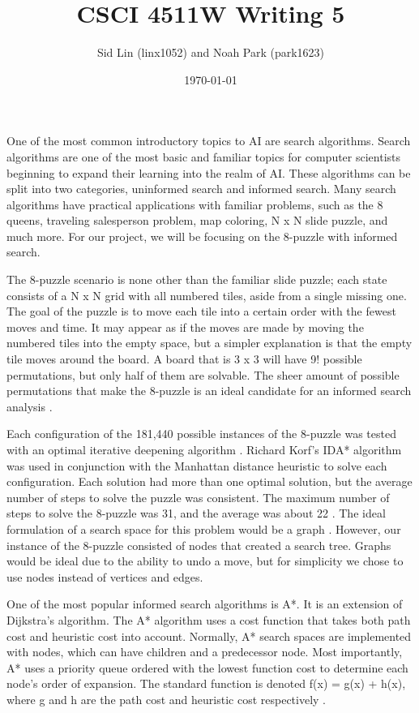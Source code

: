 \documentclass{article}
\title{CSCI 4511W Writing 5}
\date{\today}
\author{Sid Lin (linx1052) and Noah Park (park1623)}
\begin{document}
\maketitle

One of the most common introductory topics to AI are search algorithms. Search algorithms are one of the most basic and familiar topics for computer scientists beginning to expand their learning into the realm of AI. These algorithms can be split into two categories, uninformed search and informed search. Many search algorithms have practical applications with familiar problems, such as the 8 queens, traveling salesperson problem, map coloring, N x N slide puzzle, and much more. For our project, we will be focusing on the 8-puzzle with informed search.
\newline
\newline

The 8-puzzle scenario is none other than the familiar slide puzzle; each state consists of a N x N grid with all numbered tiles, aside from a single missing one. The goal of the puzzle is to move each tile into a certain order with the fewest moves and time. It may appear as if the moves are made by moving the numbered tiles into the empty space, but a simpler explanation is that the empty tile moves around the board. A board that is 3 x 3 will have 9! possible permutations, but only half of them are solvable. The sheer amount of possible permutations that make the 8-puzzle is an ideal candidate for an informed search analysis \cite{piltaver2012pathology}. 
\newline

Each configuration of the 181,440 possible instances of the 8-puzzle was tested with an optimal iterative deepening algorithm \cite{reinefeld1993complete}. Richard Korf's IDA* algorithm was used in conjunction with the Manhattan distance heuristic to solve each configuration. Each solution had more than one optimal solution, but the average number of steps to solve the puzzle was consistent. The maximum number of steps to solve the 8-puzzle was 31, and the average was about 22 \cite{reinefeld1993complete}. The ideal formulation of a search space for this problem would be a graph \cite{ratner1990n2}. However, our instance of the 8-puzzle consisted of nodes that created a search tree. Graphs would be ideal due to the ability to undo a move, but for simplicity we chose to use nodes instead of vertices and edges. 
\newline

One of the most popular informed search algorithms is A*. It is an extension of Dijkstra's algorithm. The A* algorithm uses a cost function that takes both path cost and heuristic cost into account. Normally, A* search spaces are implemented with nodes, which can have children and a predecessor node. Most importantly, A* uses a priority queue ordered with the lowest function cost to determine each node's order of expansion. The standard function is denoted f(x) = g(x) + h(x), where g and h are the path cost and heuristic cost respectively \cite{nosrati2012investigation}. 
\newline
\end{document}
